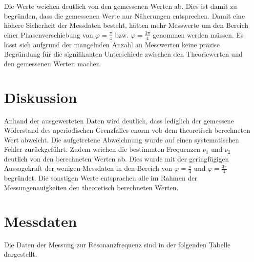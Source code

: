 Die Werte weichen deutlich von den gemessenen Werten ab.
Dies ist damit zu begründen, dass die gemessenen Werte nur Näherungen entsprechen.
Damit eine höhere Sicherheit der Messdaten besteht, hätten mehr Messwerte um den
Bereich einer Phasenverschiebung von $\varphi = \frac{\pi}{4}$ bzw.
$\varphi = \frac{3\pi}{4}$ genommen werden müssen. Es lässt sich aufgrund der
mangelnden Anzahl an Messwerten keine präzise Begründung für die signifikanten Unterschiede
zwischen den Theoriewerten und den gemessenen Werten machen.

\section{Diskussion}

Anhand der ausgewerteten Daten wird deutlich, dass lediglich der gemessene
Widerstand des aperiodischen Grenzfalles enorm vob dem theoretisch berechneten Wert
abweicht.
Die aufgetretene Abweichnung wurde auf einen systematischen Fehler zurückgeführt.
Zudem weichen die bestimmten Frequenzen $\nu_1$ und $\nu_2$ deutlich von den
berechneten Werten ab. Dies wurde mit der geringfügigen Aussagekraft der wenigen
Messdaten in den Bereich von $\varphi = \frac{\pi}{4}$ und $\varphi = \frac{3\pi}{4}$
begründet.
Die sonstigen Werte entsprachen alle im Rahmen der Messungenauigkeiten den theoretisch
berechneten Werten.

\section{Messdaten}

Die Daten der Messung zur Resonanzfrequenz sind in der folgenden Tabelle dargestellt.

